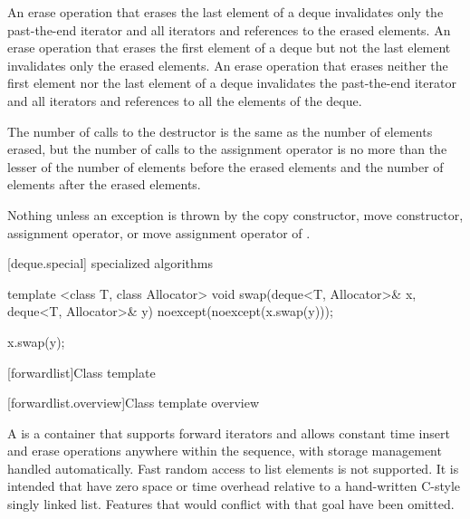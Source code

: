 \begin{itemdescr}
\pnum
\effects
An erase operation that erases the last element of a deque invalidates only the past-the-end iterator
and all iterators and references to the erased elements. An erase operation that erases the first
element of a deque but not the last element invalidates only the erased elements. An erase operation
that erases neither the first element nor the last element of a deque invalidates the past-the-end
iterator and all iterators and references to all the elements of the deque.

\pnum
\complexity
The number of calls to the destructor is the same as the
number of elements erased, but the number of calls to the assignment operator is
no more than the lesser of the number of elements before the erased elements and the number of elements after the erased elements.

\pnum
\throws
Nothing unless an exception is thrown by the copy constructor, move constructor,
assignment operator, or move assignment operator of
.
\end{itemdescr}

[deque.special]{ specialized algorithms}

%
%
\begin{itemdecl}
template <class T, class Allocator>
  void swap(deque<T, Allocator>& x, deque<T, Allocator>& y)
    noexcept(noexcept(x.swap(y)));
\end{itemdecl}

\begin{itemdescr}
\pnum
\effects
\begin{codeblock}
x.swap(y);
\end{codeblock}
\end{itemdescr}

[forwardlist]{Class template }

[forwardlist.overview]{Class template  overview}

\pnum
A  is a container that supports forward iterators and allows
constant time insert and erase operations anywhere within the sequence, with storage
management handled automatically. Fast random access to list elements is not supported.
\enternote It is intended that  have zero space or time overhead
relative to a hand-written C-style singly linked list. Features that would conflict with
that goal have been omitted.\exitnote

